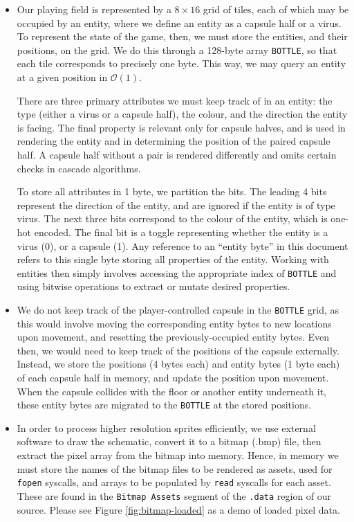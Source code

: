\documentclass{article}
\begin{document}
\begin{enumerate}
\begin{itemize}
\item Our playing field is represented by a $8\times 16$ grid of tiles, each of which may be occupied by an entity, where we define an entity as a capsule half or a virus. To represent the state of the game, then, we must store the entities, and their positions, on the grid. We do this through a 128-byte array \verb|BOTTLE|, so that each tile corresponds to precisely one byte. This way, we may query an entity at a given position in $\mathcal{O}(1)$.

There are three primary attributes we must keep track of in an entity: the type (either a virus or a capsule half), the colour, and the direction the entity is facing. The final property is relevant only for capsule halves, and is used in rendering the entity and in determining the position of the paired capsule half. A capsule half without a pair is rendered differently and omits certain checks in cascade algorithms.

To store all attributes in 1 byte, we partition the bits. The leading 4 bits represent the direction of the entity, and are ignored if the entity is of type virus. The next three bits correspond to the colour of the entity, which is one-hot encoded. The final bit is a toggle representing whether the entity is a virus (0), or a capsule (1). Any reference to an ``entity byte'' in this document refers to this single byte storing all properties of the entity. Working with entities then simply involves accessing the appropriate index of \verb|BOTTLE| and using bitwise operations to extract or mutate desired properties.

\item We do not keep track of the player-controlled capsule in the \verb|BOTTLE| grid, as this would involve moving the corresponding entity bytes to new locations upon movement, and resetting the previously-occupied entity bytes. Even then, we would need to keep track of the positions of the capsule externally. Instead, we store the positions (4 bytes each) and entity bytes (1 byte each) of each capsule half in memory, and update the position upon movement. When the capsule collides with the floor or another entity underneath it, these entity bytes are migrated to the \verb|BOTTLE| at the stored positions.

\item In order to process higher resolution sprites efficiently, we use external software to draw the schematic, convert it to a bitmap (.bmp) file, then extract the pixel array from the bitmap into memory. Hence, in memory we must store the names of the bitmap files to be rendered as assets, used for \verb|fopen| syscalls, and arrays to be populated by \verb|read| syscalls for each asset. These are found in the \verb|Bitmap Assets| segment of the \verb|.data| region of our source. Please see Figure \ref{fig:bitmap-loaded} as a demo of loaded pixel data.


\end{itemize}
\end{enumerate}
\end{document}
